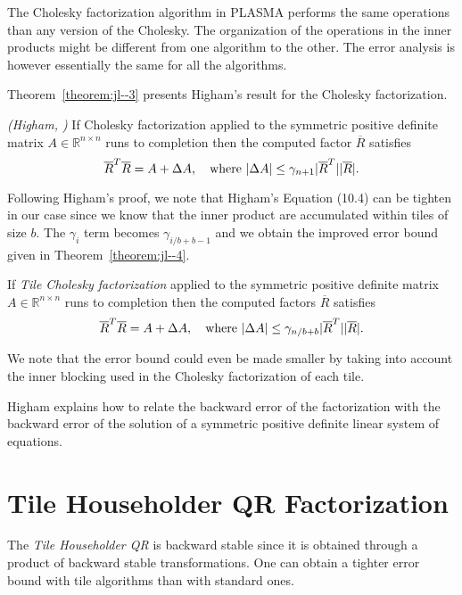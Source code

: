 The Cholesky factorization algorithm in PLASMA performs the same operations than any version of the Cholesky.
The organization of the operations in the inner products might be different from one algorithm to the other.
The error analysis is however essentially the same for all the algorithms.

Theorem~\ref{theorem:jl--3} presents Higham's result for the Cholesky factorization.
\begin{theorem}\emph{(Higham, \cite[Th.10.3]{Higham:2002:ASN})}
\label{theorem:jl--3}
If Cholesky factorization applied to the symmetric positive definite matrix $A\in \mathbb{R}^{n\times n}$ runs to completion then the computed 
factor $\overline{R}$ satisfies 
\begin{equation*}
\overline{R}^T \overline{R} = A + \Delta A, \quad \textmd{where } | \Delta A | \leq \gamma_{n+1} |\overline{R}^T||\overline{R}|.
\end{equation*}
\end{theorem}

Following Higham's proof, we note that Higham's Equation (10.4) can be tighten in our case
since we know that the inner product are accumulated within tiles of size $b$. The $\gamma_i$ term becomes
$\gamma_{i/b+b-1}$ and we obtain the improved error bound given in
Theorem~\ref{theorem:jl--4}.
\begin{theorem}
\label{theorem:jl--4}
If {\em Tile Cholesky factorization} applied to the symmetric positive definite matrix $A\in \mathbb{R}^{n\times n}$ runs to completion then the computed 
factors $\overline{R}$ satisfies 
\begin{equation*}
\overline{R}^T \overline{R} = A + \Delta A, \quad \textmd{where } | \Delta A | \leq \gamma_{n/b+b} |\overline{R}^T||\overline{R}|.
\end{equation*}
\end{theorem}
We note that the error bound could even be made smaller by taking into account the inner blocking used in the Cholesky factorization of each tile.

Higham explains how to relate the backward error of the factorization
with the backward error of the solution of a symmetric positive definite linear system of equations.

\section{Tile Householder QR Factorization}

The {\em Tile Householder QR} is backward stable since it is obtained through a product of backward stable transformations.
One can obtain a tighter error bound with tile algorithms than with standard ones.

